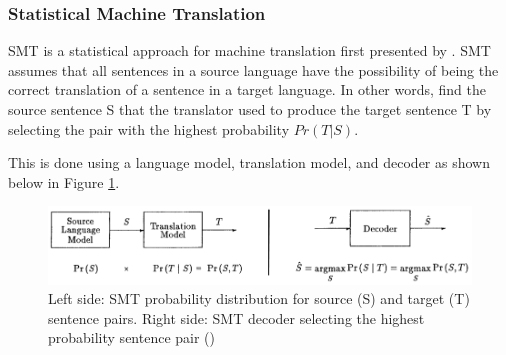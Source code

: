 \subsubsection{Statistical Machine Translation}



\acrfull{SMT} is a statistical approach for machine translation first presented by \cite{brown_statistical_1990}. 
\acrshort{SMT} assumes that all sentences in a source language have the possibility of being the correct translation of a sentence in a target language. 
In other words, find the source sentence S that the translator used to produce the target sentence T by selecting the pair with the highest probability $Pr ( T | S )$.

This is done using a language model, translation model, and decoder
as shown below in Figure \ref{fig:smt_diagram}.

\begin{figure}[ht!]
\centering
\includegraphics[width=1\textwidth]{media/literature/machine_translation/smt_3.png}
\caption[Diagram of \acrshort{SMT} probability distribution and decoder]{Left side: \acrshort{SMT} probability distribution for source (S) and target (T) sentence pairs. Right side: \acrshort{SMT} decoder selecting the highest probability sentence pair (\cite{brown_statistical_1990})}
\label{fig:smt_diagram}
\end{figure}





